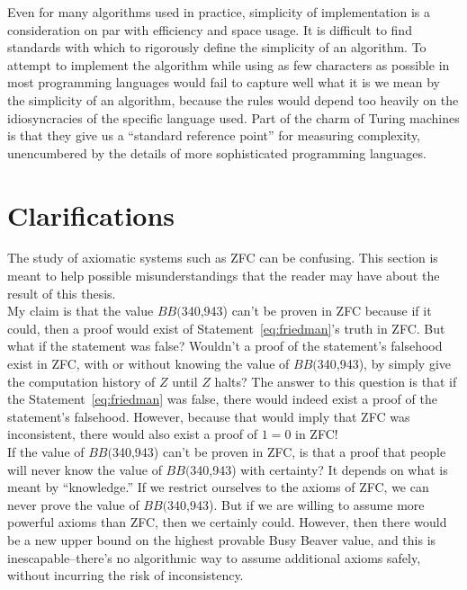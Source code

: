 \documentclass[11pt]{report}
\newcommand{\bbstatenum}{$BB($340,943) }
\newcommand{\bbstatenumcomma}{$BB($340,943), }
\newcommand{\bbstatenumperiod}{$BB($340,943). }
\begin{document}
Even for many algorithms used in practice, simplicity of implementation is a consideration on par with efficiency and space usage. It is difficult to find standards with which to rigorously define the simplicity of an algorithm. To attempt to implement the algorithm while using as few characters as possible in most programming languages would fail to capture well what it is we mean by the simplicity of an algorithm, because the rules would depend too heavily on the idiosyncracies of the specific language used. Part of the charm of Turing machines is that they give us a ``standard reference point'' for measuring complexity, unencumbered by the details of more sophisticated programming languages.

\section{Clarifications} \label{sec:faq}

The study of axiomatic systems such as ZFC can be confusing. This section is meant to help possible misunderstandings that the reader may have about the result of this thesis. \\

My claim is that the value \bbstatenum can't be proven in ZFC because if it could, then a proof would exist of Statement~\ref{eq:friedman}'s truth in ZFC. But what if the statement was false? Wouldn't a proof of the statement's falsehood exist in ZFC, with or without knowing the value of \bbstatenumcomma by simply give the computation history of $Z$ until $Z$ halts? The answer to this question is that if the Statement~\ref{eq:friedman} was false, there would indeed exist a proof of the statement's falsehood. However, because that would imply that ZFC was inconsistent, there would also exist a proof of $1=0$ in ZFC! \\

If the value of \bbstatenum can't be proven in ZFC, is that a proof that people will never know the value of \bbstatenum with certainty? It depends on what is meant by ``knowledge.'' If we restrict ourselves to the axioms of ZFC, we can never prove the value of \bbstatenumperiod But if we are willing to assume more powerful axioms than ZFC, then we certainly could. However, then there would be a new upper bound on the highest provable Busy Beaver value, and this is inescapable--there's no algorithmic way to assume additional axioms safely, without incurring the risk of inconsistency.  \\
\end{document}
